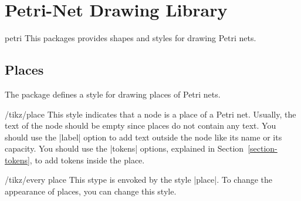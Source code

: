 %
%
%


\section{Petri-Net Drawing Library}

\begin{tikzlibrary}{petri}
  This packages provides shapes and styles for drawing Petri nets. 
\end{tikzlibrary}



\subsection{Places}

The package defines a style for drawing places of Petri nets. 

\begin{stylekey}{/tikz/place}
  This style indicates that a node is a place of a Petri net. Usually,
  the text of the node should be empty since places do not contain any
  text. You should use the |label| option to add text outside the node
  like its name or its capacity. You should use the |tokens| options,
  explained in Section~\ref{section-tokens}, to add tokens inside the
  place.
  
\begin{codeexample}[]
\end{codeexample}
  
  \begin{stylekey}{/tikz/every place}
    This stype is envoked by the style |place|. To change the
    appearance of places, you can change this style.
\begin{codeexample}[]
\end{codeexample}
  \end{stylekey}
\end{stylekey}




